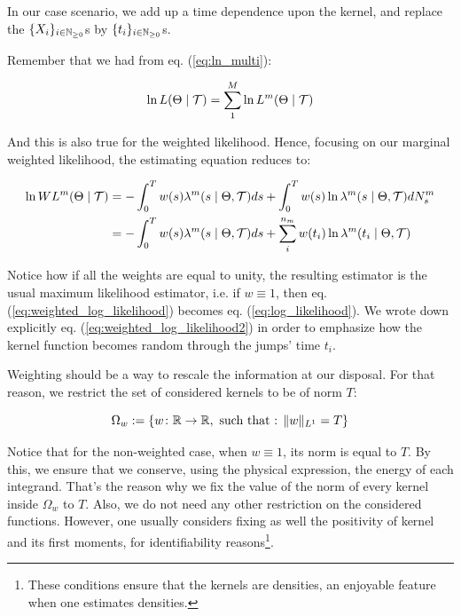 In our case scenario, we add up a time dependence upon the kernel, and replace the $\{ X_i \}_{ i \in \mathbb{N}_{\geq 0}}$s by $\{ t_i \}_{ i \in \mathbb{N}_{\geq 0}}$s.


Remember that we had from eq. (\ref{eq:ln_multi}):
 
\begin{equation}
\ln L( \Theta \mid \mathcal{T} ) = \sum_1^M \ln L^m( \Theta \mid \mathcal{T} )
\end{equation}

And this is also true for the weighted likelihood. Hence, focusing on our marginal weighted likelihood, the estimating equation reduces to:



\begin{align}
\ln W L^m( \Theta \mid \mathcal{T} ) &= - \int_0^T w(s) \lambda^{m} ( s \mid \Theta , \mathcal{T} ) ds + \int_0^T w(s) \ln \lambda^{m} ( s \mid \Theta , \mathcal{T} ) d N_s^m  
\label{eq:weighted_log_likelihood} \\
&=  - \int_0^T w(s) \lambda^{m} ( s \mid \Theta , \mathcal{T} )  ds +  \sum^{n_m}_i  w(t_i) \ln \lambda^{m} ( t_i \mid \Theta , \mathcal{T} )  \label{eq:weighted_log_likelihood2} 
\end{align}

Notice how if all the weights are equal to unity, the resulting estimator is the usual maximum likelihood estimator, i.e. if $w \equiv 1$, then eq. (\ref{eq:weighted_log_likelihood}) becomes eq. (\ref{eq:log_likelihood}). We wrote down explicitly eq. (\ref{eq:weighted_log_likelihood2}) in order to emphasize how the kernel function becomes random through the jumps' time $t_i$. 

Weighting should be a way to rescale the information at our disposal. For that reason, we restrict the set of considered kernels to be of norm $T$:

$$\Omega_w := \{ w \colon \mathbb R \to \mathbb R, \text{ such that : } \lVert w\rVert_{L^1 } = T \} $$

Notice that for the non-weighted case, when $w \equiv 1$, its norm is equal to $T$. By this, we ensure that we conserve, using the physical expression, the energy of each integrand. That's the reason why we fix the value of the norm of every kernel inside $\Omega_w$ to $T$. Also, we do not need any other restriction on the considered functions. However, one usually considers fixing as well the positivity of kernel and its first moments, for identifiability reasons\footnote{These conditions ensure that the kernels are densities, an enjoyable feature when one estimates densities.}. 

